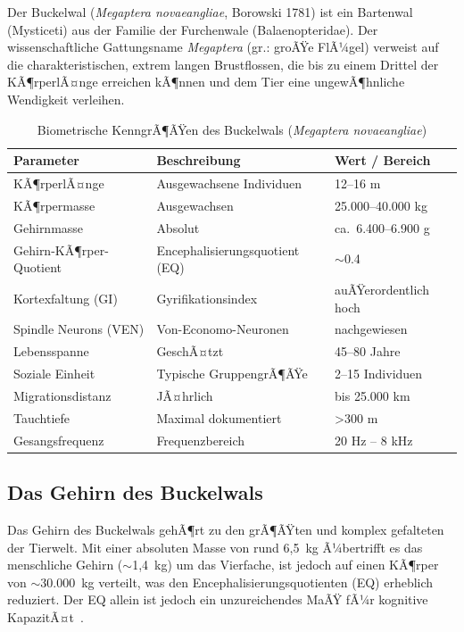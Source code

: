 ﻿\documentclass[12pt,a4paper]{article}
\theoremstyle{definition}
\theoremstyle{remark}
\begin{document}
Der Buckelwal (\textit{Megaptera novaeangliae}, Borowski 1781) ist ein
Bartenwal (Mysticeti) aus der Familie der Furchenwale (Balaenopteridae). Der
wissenschaftliche Gattungsname \textit{Megaptera} (gr.: groÃŸe FlÃ¼gel)
verweist auf die charakteristischen, extrem langen Brustflossen, die bis zu
einem Drittel der KÃ¶rperlÃ¤nge erreichen kÃ¶nnen und dem Tier eine ungewÃ¶hnliche
Wendigkeit verleihen.

\begin{table}[h]
  \centering
  \caption{Biometrische KenngrÃ¶ÃŸen des Buckelwals (\textit{Megaptera novaeangliae})}
  \label{tab:biometrie}
  \begin{tabularx}{\textwidth}{lXl}
    \toprule
    \textbf{Parameter} & \textbf{Beschreibung} & \textbf{Wert / Bereich} \\
    \midrule
    KÃ¶rperlÃ¤nge & Ausgewachsene Individuen & 12--16 m \\
    KÃ¶rpermasse & Ausgewachsen & 25.000--40.000 kg \\
    Gehirnmasse & Absolut & ca.\ 6.400--6.900 g \\
    Gehirn-KÃ¶rper-Quotient & Encephalisierungsquotient (EQ) & $\sim$0.4 \\
    Kortexfaltung (GI) & Gyrifikationsindex & auÃŸerordentlich hoch \\
    Spindle Neurons (VEN) & Von-Economo-Neuronen & nachgewiesen \\
    Lebensspanne & GeschÃ¤tzt & 45--80 Jahre \\
    Soziale Einheit & Typische GruppengrÃ¶ÃŸe & 2--15 Individuen \\
    Migrations\-distanz & JÃ¤hrlich & bis 25.000 km \\
    Tauchtiefe & Maximal dokumentiert & >300 m \\
    Gesangsfrequenz & Frequenzbereich & 20 Hz -- 8 kHz \\
    \bottomrule
  \end{tabularx}
\end{table}

\subsection{Das Gehirn des Buckelwals}

Das Gehirn des Buckelwals gehÃ¶rt zu den grÃ¶ÃŸten und komplex gefalteten der
Tierwelt. Mit einer absoluten Masse von rund 6,5~kg Ã¼bertrifft es das
menschliche Gehirn ($\sim$1,4~kg) um das Vierfache, ist jedoch auf einen
KÃ¶rper von $\sim$30.000~kg verteilt, was den Encephalisierungsquotienten
(EQ) erheblich reduziert. Der EQ allein ist jedoch ein unzureichendes MaÃŸ fÃ¼r
kognitive KapazitÃ¤t~\cite{roth2005evolution}.
\end{document}
